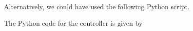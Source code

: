 Alternatively, we could have used the following Python script.


The Python code for the controller is given by

